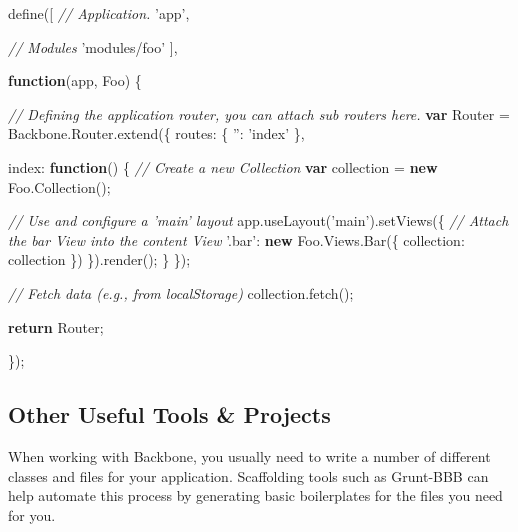 \documentclass[9pt]{book}
\newenvironment{Shaded}{}{}
\newcommand{\KeywordTok}[1]{\textcolor[rgb]{0.00,0.44,0.13}{\textbf{{#1}}}}
\newcommand{\DataTypeTok}[1]{\textcolor[rgb]{0.56,0.13,0.00}{{#1}}}
\newcommand{\StringTok}[1]{\textcolor[rgb]{0.25,0.44,0.63}{{#1}}}
\newcommand{\CommentTok}[1]{\textcolor[rgb]{0.38,0.63,0.69}{\textit{{#1}}}}
\newcommand{\OtherTok}[1]{\textcolor[rgb]{0.00,0.44,0.13}{{#1}}}
\newcommand{\FunctionTok}[1]{\textcolor[rgb]{0.02,0.16,0.49}{{#1}}}
\newcommand{\NormalTok}[1]{{#1}}
\begin{document}
\begin{Shaded}
\begin{Highlighting}[]
\FunctionTok{define}\NormalTok{([}
  \CommentTok{// Application.}
  \StringTok{'app'}\NormalTok{,}

  \CommentTok{// Modules}
  \StringTok{'modules/foo'}
\NormalTok{],}

\KeywordTok{function}\NormalTok{(app, Foo) \{}

  \CommentTok{// Defining the application router, you can attach sub routers here.}
  \KeywordTok{var} \NormalTok{Router = }\OtherTok{Backbone}\NormalTok{.}\OtherTok{Router}\NormalTok{.}\FunctionTok{extend}\NormalTok{(\{}
    \DataTypeTok{routes}\NormalTok{: \{}
      \StringTok{''}\NormalTok{: }\StringTok{'index'}
    \NormalTok{\},}

    \DataTypeTok{index}\NormalTok{: }\KeywordTok{function}\NormalTok{() \{}
            \CommentTok{// Create a new Collection}
            \KeywordTok{var} \NormalTok{collection = }\KeywordTok{new} \OtherTok{Foo}\NormalTok{.}\FunctionTok{Collection}\NormalTok{();}

            \CommentTok{// Use and configure a 'main' layout}
            \OtherTok{app}\NormalTok{.}\FunctionTok{useLayout}\NormalTok{(}\StringTok{'main'}\NormalTok{).}\FunctionTok{setViews}\NormalTok{(\{}
                    \CommentTok{// Attach the bar View into the content View}
                    \StringTok{'.bar'}\NormalTok{: }\KeywordTok{new} \OtherTok{Foo}\NormalTok{.}\OtherTok{Views}\NormalTok{.}\FunctionTok{Bar}\NormalTok{(\{}
                            \DataTypeTok{collection}\NormalTok{: collection}
                    \NormalTok{\})}
             \NormalTok{\}).}\FunctionTok{render}\NormalTok{();}
    \NormalTok{\}}
  \NormalTok{\});}

  \CommentTok{// Fetch data (e.g., from localStorage)}
  \OtherTok{collection}\NormalTok{.}\FunctionTok{fetch}\NormalTok{();}

  \KeywordTok{return} \NormalTok{Router;}

\NormalTok{\});}
\end{Highlighting}
\end{Shaded}

\subsection{Other Useful Tools \&
Projects}\label{other-useful-tools-projects}

When working with Backbone, you usually need to write a number of
different classes and files for your application. Scaffolding tools such
as Grunt-BBB can help automate this process by generating basic
boilerplates for the files you need for you.
\end{document}
